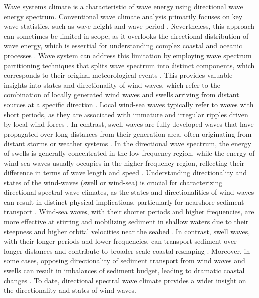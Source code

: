Wave systems climate is a characteristic of wave energy using directional wave
energy spectrum. Conventional wave climate analysis primarily focuses on key
wave statistics, such as wave height and wave period
\citep{resio2002meteorology,casas2024wind}. Nevertheless, this approach can
sometimes be limited in scope, as it overlooks the directional distribution of
wave energy, which is essential for understanding complex coastal and oceanic
processes \citep{kamphuis2020introduction,komar1998modeling}. Wave system can
address this limitation by employing wave spectrum partitioning techniques that
splits wave spectrum into distinct components, which corresponds to their
original meteorological events
\citep{jiang_wave_2019,portilla-yandun_wave_2015}. This provides valuable
insights into states and directionality of wind-waves, which refer to the
combination of locally generated wind waves and swells arriving from distant
sources at a specific direction \citep{han_directional_2022}. Local wind-sea
waves typically refer to waves with short periods, as they are associated with
immature and irregular ripples driven by local wind forces
\citep{hanson_wind_1999}.  In contrast, swell waves are fully developed waves
that have propagated over long distances from their generation area, often
originating from distant storms or weather systems \citep{alford_internal_2001}.
In the directional wave spectrum, the energy of swells is generally concentrated
in the low-frequency region, while the energy of wind-sea waves usually occupies
in the higher frequency region, reflecting their difference in terms of wave
length and speed \citep{george_nearshore_2020,vettor_global_2020}.
Understanding directionality and states of the wind-waves (swell or wind-sea) is
crucial for characterizing directional spectral wave climates, as the states and
directionalities of wind waves can result in distinct physical implications,
particularly for nearshore sediment transport
\citep{george_nearshore_2020,work2011directional,de2020optimal}. Wind-sea waves,
with their shorter periods and higher frequencies, are more effective at
stirring and mobilizing sediment in shallow waters due to their steepness and
higher orbital velocities near the seabed
\citep{boechat_albernaz_effects_2019,nabavianpour_experimental_2024}. In
contrast, swell waves, with their longer periods and lower frequencies, can
transport sediment over longer distances and contribute to broader-scale coastal
reshaping \citep{basaran_effect_2021}. Moreover, in some cases, opposing
directionality of sediment transport from wind waves and swells can result in
imbalances of sediment budget, leading to dramatic coastal changes
\citep{hapke_review_2010}. To date, directional spectral wave climate provides a
wider insight on the directionality and states of wind waves.

